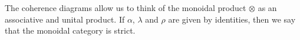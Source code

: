 \documentclass[../thesis.tex]{subfiles}
\begin{document}
\begin{definition}
\begin{center}
{\begin{tikzcd}[ampersand replacement = \&]
                    \end{tikzcd}
                }
            \end{center}
        \end{definition}

        The coherence diagrams allow us to think of the monoidal product $\otimes$ as an associative and unital product. If $\alpha$, $\lambda$ and $\rho$ are given by identities, then we say that the monoidal category is strict.
\end{document}
